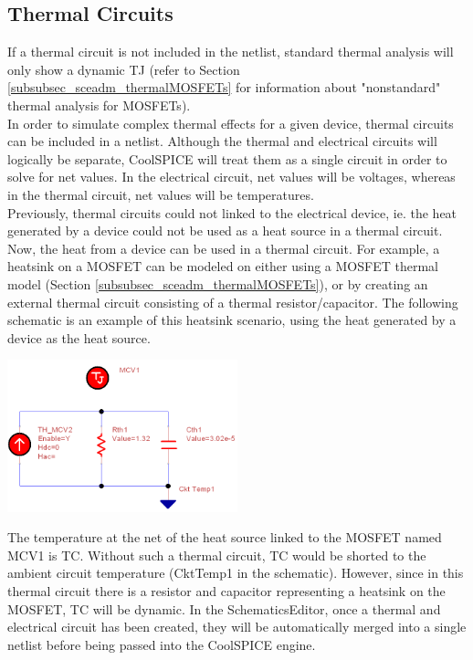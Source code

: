 \subsection{Thermal Circuits}
\label{subsec_sceadm_thermalCircuits}

If a thermal circuit is not included in the netlist, standard thermal analysis will only show a dynamic TJ (refer to Section \ref{subsubsec_sceadm_thermalMOSFETs} for information about "nonstandard" thermal analysis for MOSFETs). \\

In order to simulate complex thermal effects for a given device, thermal circuits can be included in a netlist. Although the thermal and electrical circuits will logically be separate, CoolSPICE will treat them as a single circuit in order to solve for net values. In the electrical circuit, net values will be voltages, whereas in the thermal circuit, net values will be temperatures. \\

Previously, thermal circuits could not linked to the electrical device, ie. the heat generated by a device could not be used as a heat source in a thermal circuit. Now, the heat from a device can be used in a thermal circuit. For example, a heatsink on a MOSFET can be modeled on either using a MOSFET thermal model (Section \ref{subsubsec_sceadm_thermalMOSFETs}), or by creating an external thermal circuit consisting of a thermal resistor/capacitor. The following schematic is an example of this heatsink scenario, using the heat generated by a device as the heat source. \\

\centerline{\includegraphics[width=0.5\textwidth]
{./figures/thermal_figures/ThermalHeatsink.png}}

The temperature at the net of the heat source linked to the MOSFET named MCV1 is TC. Without such a thermal circuit, TC would be shorted to the ambient circuit temperature (CktTemp1 in the schematic). However, since in this thermal circuit there is a resistor and capacitor representing a heatsink on the MOSFET, TC will be dynamic. In the SchematicsEditor, once a thermal and electrical circuit has been created, they will be automatically merged into a single netlist before being passed into the CoolSPICE engine. \\


